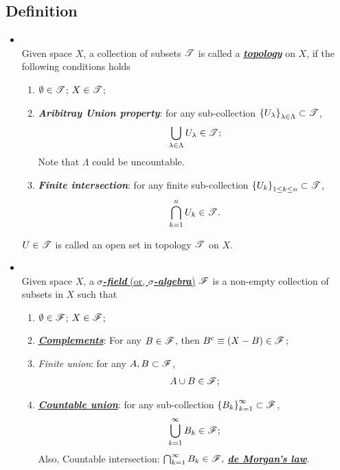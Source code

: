 \documentclass[11pt]{article}
\begin{document}
\subsection{Definition}
\begin{itemize}
\item \begin{definition} \citep{munkres2000topology}\\
Given space $X$, a collection of subsets ${\mathscr T}$ is called a \underline{\emph{\textbf{topology}}} on $X$, if the following conditions holds
\begin{enumerate}
\item $\emptyset \in {\mathscr T}$; $X\in {\mathscr T}$;
\item \emph{\textbf{Aribitray Union property}}: for any sub-collection $\left\{U_{\lambda}\right\}_{\lambda\in \Lambda} \subset {\mathscr T}$, 
\begin{align*}
\bigcup_{\lambda\in \Lambda}U_{\lambda} \in {\mathscr T};
\end{align*} Note that $\Lambda$ could be uncountable. 
\item \emph{\textbf{Finite intersection}}: for any finite sub-collection $\left\{U_{k}\right\}_{1\le k \le n} \subset {\mathscr T}$, 
\begin{align*}
\bigcap_{k=1}^{n}U_{k} \in {\mathscr T}.
\end{align*}
\end{enumerate}
$U\in {\mathscr T}$ is called an open set in topology ${\mathscr T}$ on $X$.
\end{definition}

\item \begin{definition} \citep{royden1988real, billingsley2008probability, folland2013real, resnick2013probability}\\
Given space $X$, a \underline{\emph{\textbf{$\sigma$-field}} (or, \emph{\textbf{$\sigma$-algebra}})} ${\mathscr F}$ is a non-empty collection of subsets in $X$ such that 
\begin{enumerate}
\item $\emptyset \in {\mathscr F}$; $X\in {\mathscr F}$;
\item \underline{\emph{\textbf{Complements}}}:  For any $B\in {\mathscr F}$, then $B^{c}\equiv (X-B) \in {\mathscr F}$;
\item \emph{Finite union}: for any  $A, B \subset {\mathscr F}$, 
\begin{align*}
A\cup B \in {\mathscr F};
\end{align*} 
\item \underline{\emph{\textbf{Countable union}}}: for any sub-collection $\left\{B_{k}\right\}_{k=1}^{\infty} \subset {\mathscr F}$, 
\begin{align*}
\bigcup_{k=1}^{\infty}B_{k} \in {\mathscr F};
\end{align*} 
Also, Countable intersection: $\bigcap_{k=1}^{\infty}B_{k} \in {\mathscr F},$ \underline{\emph{\textbf{de Morgan's law}}}.
\end{enumerate} 
\end{definition}



\end{itemize}
\end{document}

